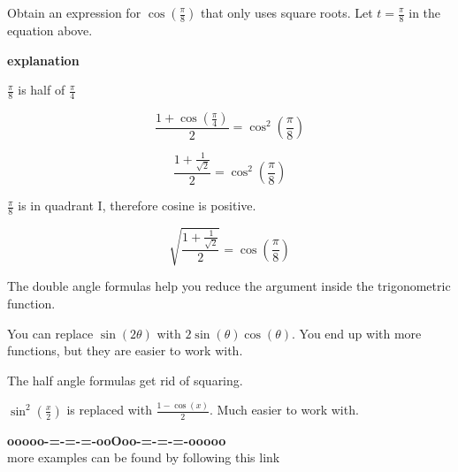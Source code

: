 \documentclass{ximera}
\begin{document}
\begin{example}

Obtain an expression for $\cos\left(  \frac{\pi}{8}  \right)$ that only uses square roots.
Let $t = \frac{\pi}{8}$ in the equation above.



\textbf{\textcolor{red!75!green}{explanation}} 

$\frac{\pi}{8}$ is half of $\frac{\pi}{4}$




\[   \frac{1 + \cos( \frac{\pi}{4} )}{2}  =   \cos^2\left( \frac{\pi}{8} \right)  \]


\[   \frac{1 + \frac{1}{\sqrt{2}}}{2}  =   \cos^2\left( \frac{\pi}{8} \right)  \]



$\frac{\pi}{8}$ is in quadrant I, therefore cosine is positive.




\[   \sqrt{ \frac{1 + \frac{1}{\sqrt{2}}}{2} }  =   \cos\left( \frac{\pi}{8} \right)  \]





\end{example}


The double angle formulas help you reduce the argument inside the trigonometric function. 


You can replace $\sin(2 \theta)$ with $2 \sin(\theta) \cos(\theta)$.  You end up with more functions, but they are easier to work with. 


The half angle formulas get rid of squaring.


$\sin^2\left( \tfrac{x}{2} \right)$ is replaced with $\frac{1 - \cos(x)}{2}$.  Much easier to work with.















\begin{center}
\textbf{\textcolor{green!50!black}{ooooo-=-=-=-ooOoo-=-=-=-ooooo}} \\

more examples can be found by following this link\\ 

\end{center}
\end{document}
